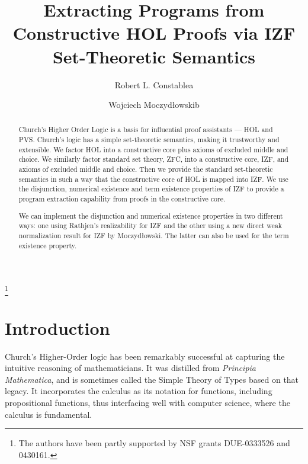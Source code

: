 \documentclass{LMCS}
\begin{document}
\title{Extracting Programs from Constructive HOL Proofs via IZF
Set-Theoretic Semantics}

\author[R.L.~Constable]{Robert L. Constable\rsuper a}
\address{{}Department of Computer Science, Cornell University, Ithaca, NY,14853, USA}

\author[W.~Moczyd\l owski]{Wojciech Moczyd\l owski\rsuper b}
\thanks{{}The authors have been partly supported by NSF grants DUE-0333526 and 0430161.}

\titlecomment{}

\begin{abstract} 
\noindent Church's Higher Order Logic is a basis for influential proof
assistants --- HOL and PVS.  Church's logic has a simple set-theoretic
semantics, making it trustworthy and extensible.  We factor HOL into a
constructive core plus axioms of excluded middle and choice. We
similarly factor standard set theory, ZFC, into a constructive core,
IZF, and axioms of excluded middle and choice. Then we provide the
standard set-theoretic semantics in such a way that the constructive
core of HOL is mapped into IZF.  We use the disjunction, numerical
existence and term existence properties of IZF to provide a program 
extraction capability from proofs in the constructive core.

We can implement the disjunction and numerical existence properties in two
different ways: one using Rathjen's realizability for IZF and the
other using a new direct weak normalization result for IZF by Moczyd\l owski. 
The latter can also be used for the term existence property. 
\end{abstract}

\maketitle

\section{Introduction} 

Church's Higher-Order logic \cite{Chu40,Lei94c} has been remarkably successful
at capturing the intuitive reasoning of mathematicians.  It was
distilled from {\em Principia Mathematica}, and is sometimes called the
Simple Theory of Types based on that legacy.  It incorporates the 
calculus as its notation for functions, including propositional functions,
thus interfacing well with computer science, where the  calculus is
fundamental. 
\end{document}
